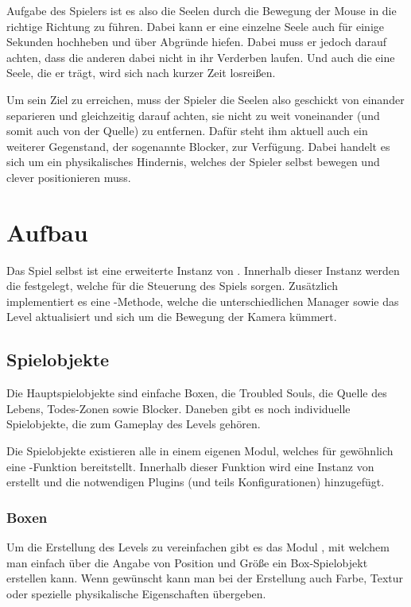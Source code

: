 Aufgabe des Spielers ist es also die Seelen durch die Bewegung der Mouse in die richtige Richtung zu führen. Dabei kann er eine einzelne Seele auch für einige Sekunden hochheben und über Abgründe hiefen. Dabei muss er jedoch darauf achten, dass die anderen dabei nicht in ihr Verderben laufen. Und auch die eine Seele, die er trägt, wird sich nach kurzer Zeit losreißen. 

Um sein Ziel zu erreichen, muss der Spieler die Seelen also geschickt von einander separieren und gleichzeitig darauf achten, sie nicht zu weit voneinander (und somit auch von der Quelle) zu entfernen. Dafür steht ihm aktuell auch ein weiterer Gegenstand, der sogenannte Blocker, zur Verfügung. Dabei handelt es sich um ein physikalisches Hindernis, welches der Spieler selbst bewegen und clever positionieren muss.

\chapter{Aufbau}

Das Spiel selbst ist eine erweiterte Instanz von . Innerhalb dieser Instanz werden die  festgelegt, welche für die Steuerung des Spiels sorgen. Zusätzlich implementiert es eine -Methode, welche die unterschiedlichen Manager sowie das Level aktualisiert und sich um die Bewegung der Kamera kümmert.

\section{Spielobjekte}

Die Hauptspielobjekte sind einfache Boxen, die Troubled Souls, die Quelle des Lebens, Todes-Zonen sowie Blocker. Daneben gibt es noch individuelle Spielobjekte, die zum Gameplay des Levels gehören.

Die Spielobjekte existieren alle in einem eigenen Modul, welches für gewöhnlich eine -Funktion bereitstellt. Innerhalb dieser Funktion wird eine Instanz von  erstellt und die notwendigen Plugins (und teils Konfigurationen) hinzugefügt.

\subsection{Boxen}

Um die Erstellung des Levels zu vereinfachen gibt es das Modul , mit welchem man einfach über die Angabe von Position und Größe ein Box-Spielobjekt erstellen kann. Wenn gewünscht kann man bei der Erstellung auch Farbe, Textur oder spezielle physikalische Eigenschaften übergeben.

